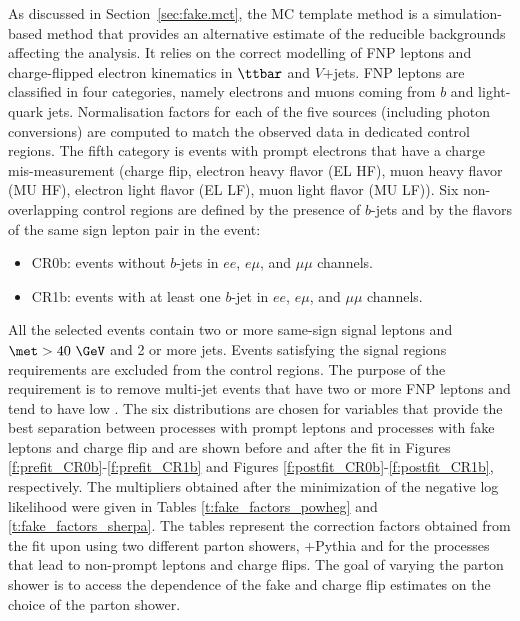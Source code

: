 As discussed in Section~\ref{sec:fake.mct}, the MC template method is
 a simulation-based method that provides an alternative estimate of the reducible backgrounds affecting the analysis.
It relies on the correct modelling of FNP leptons and charge-flipped electron kinematics in $\ttbar$ 
and $V$+jets.
FNP leptons are classified in four categories, namely electrons and muons coming 
from $b$ and light-quark jets. Normalisation factors for each of the five sources (including photon conversions) are computed to match the observed data 
in dedicated control regions. The fifth category is events with prompt electrons that have a charge mis-measurement 
(charge flip, electron heavy flavor (EL HF), 
muon heavy flavor (MU HF), 
electron light flavor (EL LF), 
muon light flavor (MU LF)).
Six non-overlapping control regions are defined by the presence of $b$-jets and by the flavors of the same sign lepton pair in the event:
\begin{itemize}
\item CR0b: events without $b$-jets in $ee$, $e\mu$, and $\mu\mu$ channels.
\item CR1b: events with at least one $b$-jet in $ee$, $e\mu$, and $\mu\mu$ channels.
\end{itemize}
All the selected events contain two or more same-sign signal leptons and \\$\met >40~\GeV$ and 2 or more jets. 
Events satisfying the signal regions requirements are excluded from the control regions. 
The purpose of the \met requirement is to remove multi-jet events that have two or more FNP leptons and tend to have low \met. 
The six distributions are chosen for variables that provide the best separation between processes with prompt leptons and processes with 
fake leptons and charge flip and are shown 
before and after the fit in Figures \ref{f:prefit_CR0b}-\ref{f:prefit_CR1b} and Figures \ref{f:postfit_CR0b}-\ref{f:postfit_CR1b}, 
respectively. 
The multipliers obtained after the minimization of the negative log likelihood were given 
in Tables \ref{t:fake_factors_powheg} and \ref{t:fake_factors_sherpa}.
The tables represent the correction factors obtained from the fit upon using two different parton showers, \POWHEGBOX+Pythia and \SHERPA
for the processes that lead to non-prompt leptons and charge flips.
The goal of varying the parton shower is to access the dependence of the fake and charge flip estimates on the choice of the 
parton shower. 

